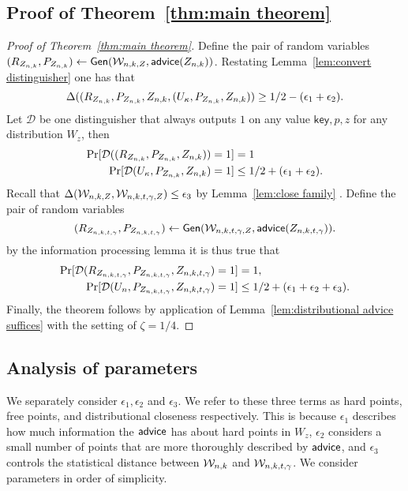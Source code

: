 \subsection{Proof of Theorem~\ref{thm:main theorem}}
\label{ssec:proof main theorem}
\begin{proof}[Proof of Theorem~\ref{thm:main theorem}]
Define the pair of random variables $(R_{Z_{n,k}},P_{Z_{n,k}}) \leftarrow {\ensuremath{\mathsf{Gen}}}(\mathcal{W}_{n,k, Z}, {\mathsf{advice}}(Z_{n,k}))$.
Restating Lemma~\ref{lem:convert distinguisher} one has that 
\[
\Delta((R_{Z_{n,k}}, P_{Z_{n,k}}, Z_{n,k}, (U_\kappa, P_{Z_{n,k}}, Z_{n,k}))\ge 1/2-(\epsilon_1+\epsilon_2).
\]
Let $\mathcal{D}$ be one distinguisher that always outputs $1$ on any value $\mathsf{key}, p, z$ for any distribution $W_z$, then
\begin{align*}
\Pr[\mathcal{D}((R_{Z_{n,k}}, P_{Z_{n,k}}, Z_{n,k}))=1] &=1\\
\Pr[\mathcal{D}(U_\kappa, P_{Z_{n,k}}, Z_{n,k})=1]&\le 1/2+(\epsilon_1+\epsilon_2).
\end{align*}
Recall that $\Delta(\mathcal{W}_{n,k, Z}, \mathcal{W}_{n,k,t,\gamma, Z}) \le \epsilon_3$ by Lemma~\ref{lem:close family} .  Define the pair of random variables \[(R_{Z_{n,k,t,\gamma}}, P_{Z_{n,k,t,\gamma}})\leftarrow {\ensuremath{\mathsf{Gen}}}(\mathcal{W}_{n,k,t,\gamma, Z}, {\mathsf{advice}}(Z_{n,k,t,\gamma})).\]
by the information processing lemma it is thus true that 
\begin{align*}
\Pr[\mathcal{D}(R_{Z_{n,k,t,\gamma}}, P_{Z_{n,k,t,\gamma}}, Z_{n,k,t,\gamma})=1]&=1,\\
\Pr[\mathcal{D}(U_n, P_{Z_{n,k,t,\gamma}}, Z_{n,k,t,\gamma})=1]&\le 1/2+(\epsilon_1+\epsilon_2+\epsilon_3).
\end{align*}
Finally, the theorem follows by application of Lemma~\ref{lem:distributional advice suffices} with the setting of $\zeta = 1/4$.
\end{proof} 



\subsection{Analysis of parameters}
\label{ssec:analysis params}
We separately consider $\epsilon_1, \epsilon_2$ and $\epsilon_3$. We refer to these three terms as hard points, free points, and distributional closeness respectively. This is because $\epsilon_1$ describes how much information the ${\mathsf{advice}}$ has about hard points in $W_z$, $\epsilon_2$ considers a small number of points that are more thoroughly described by ${\mathsf{advice}}$, and $\epsilon_3$ controls the statistical distance between $\mathcal{W}_{n,k}$ and $\mathcal{W}_{n,k,t,\gamma}$.  We consider parameters in order of simplicity.




